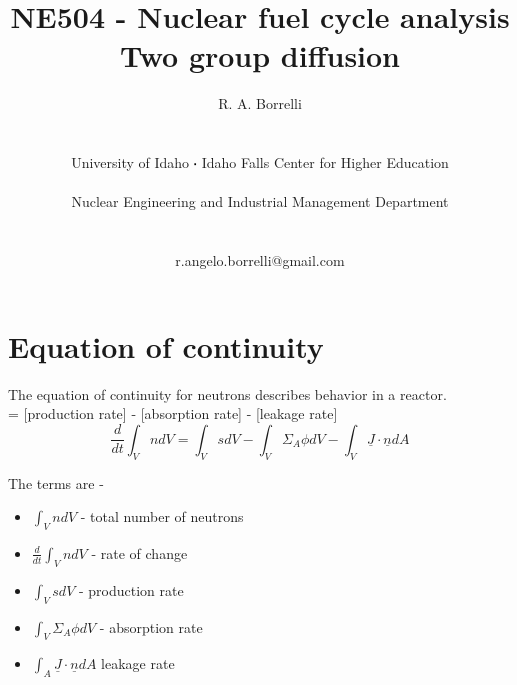 \documentclass[11pt,a4paper]{article}
\newcommand*\sq{\mathbin{\vcenter{\hbox{\rule{.3ex}{.3ex}}}}} %
\begin{document}
\begin{titlepage}
    \title{
        NE504 - Nuclear fuel cycle analysis\\
        Two group diffusion\\
    }
    \author{
        R. A. Borrelli
        \\ \\ \\
        University of Idaho $\sq$ Idaho Falls Center for Higher Education
        \\ \\
        Nuclear Engineering and Industrial Management Department
        \\ \\ \\
        r.angelo.borrelli@gmail.com
    }
\clearpage %
\maketitle
\thispagestyle{empty} %
\end{titlepage}

\section{Equation of continuity}
\noindent The equation of continuity for neutrons describes behavior in a reactor.\\

 = [production rate] - [absorption rate] - [leakage rate]\\

\begin{equation} \label{eq-1-continuity}
    \frac{d}{dt}\int_V ndV=\int_V sdV-\int_V\Sigma_A\phi dV-\int_V\underline{J}\cdot\underline{n}dA
\end{equation}

\noindent The terms are - 
\begin{itemize}[leftmargin=*,topsep=0pt]
    \item $\int_V ndV$ - total number of neutrons
    \item $\frac{d}{dt} \int_V ndV$ - rate of change
    \item $\int_V sdV$ - production rate
    \item $\int_V \Sigma_A \phi dV$ - absorption rate
    \item $\int_A \underline{J} \cdot \underline{n} dA$ leakage rate
\end{itemize}
\vspace{\baselineskip}
\end{document}
